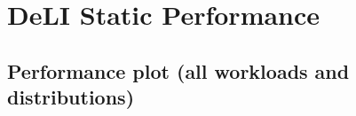 \documentclass{article}
\begin{document}




\section{DeLI Static Performance}\label{sec:deliconfig}

\subsection{Performance plot (all workloads and distributions)}
\end{document}
